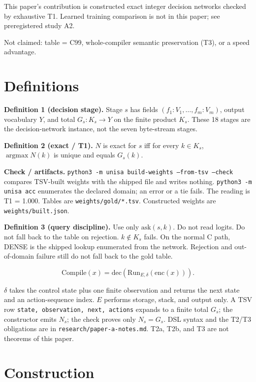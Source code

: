 \documentclass[11pt]{article}
\begin{document}
This paper's contribution is constructed exact integer decision networks checked by exhaustive T1. Learned training comparison is not in this paper; see preregistered study A2.

Not claimed: table = C99, whole-compiler semantic preservation (T3), or a speed advantage.

\section{Definitions}\label{problem-formulation}

\textbf{Definition 1 (decision stage).} Stage $s$ has fields $(f_1{:}V_1,\ldots,f_m{:}V_m)$, output vocabulary $Y$, and total $G_s:K_s\to Y$ on the finite product $K_s$. These 18 stages are the decision-network instance, not the seven byte-stream stages.

\textbf{Definition 2 (exact / T1).} $N$ is exact for $s$ iff for every $k\in K_s$, $\operatorname{argmax} N(k)$ is unique and equals $G_s(k)$.

\textbf{Check / artifacts.} \texttt{python3 -m unisa build-weights --from-tsv --check} compares TSV-built weights with the shipped file and writes nothing. \texttt{python3 -m unisa acc} enumerates the declared domain; an error or a tie fails. The reading is T1 = 1.000. Tables are \texttt{weights/gold/*.tsv}. Constructed weights are \texttt{weights/built.json}.

\textbf{Definition 3 (query discipline).} Use only $\mathrm{ask}(s,k)$. Do not read logits. Do not fall back to the table on rejection. $k\notin K_s$ fails. On the normal C path, DENSE is the shipped lookup enumerated from the network. Rejection and out-of-domain failure still do not fall back to the gold table.

\[
\mathrm{Compile}(x)=\mathrm{dec}(\mathrm{Run}_{E,\delta}(\mathrm{enc}(x))).
\]

$\delta$ takes the control state plus one finite observation and returns the next state and an action-sequence index. $E$ performs storage, stack, and output only. A TSV row \texttt{state, observation, next, actions} expands to a finite total $G_s$; the constructor emits $N_s$; the check proves only $N_s=G_s$. DSL syntax and the T2/T3 obligations are in \texttt{research/paper-a-notes.md}. T2a, T2b, and T3 are not theorems of this paper.

\section{Construction}\label{weight-construction}
\end{document}

